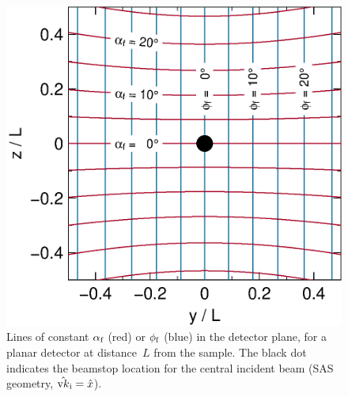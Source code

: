\begin{figure}[t]
\begin{center}
\includegraphics[width=.47\textwidth]{fig/drawing/SAS_const_alphi.ps}
\end{center}
\caption{Lines of constant $\alpha_{\text{f}}$ (red) or $\phi_{\text{f}}$ (blue)
in the detector plane,
for a planar detector at distance~$L$ from the sample.
The black dot indicates the beamstop location for
the central incident beam (SAS geometry, $\hat{\text{v}{k}}_{\text{i}} = \hat x$).}
\label{Fconstalphi}
\end{figure}

